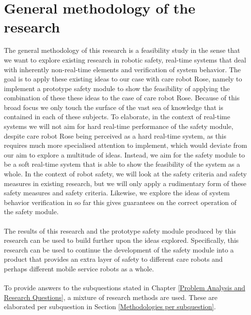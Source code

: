 \documentclass[12pt]{scrreprt}
\begin{document}
\section{General methodology of the research}
\label{General methodology of the research}
The general methodology of this research is a feasibility study in the sense that we want to explore existing research in robotic safety, real-time systems that deal with inherently non-real-time elements and verification of system behavior. The goal is to apply these existing ideas to our case with care robot Rose, namely to implement a prototype safety module to show the feasibility of applying the combination of these these ideas to the case of care robot Rose. Because of this broad focus we only touch the surface of the vast sea of knowledge that is contained in each of these subjects. To elaborate, in the context of real-time systems we will not aim for hard real-time performance of the safety module, despite care robot Rose being perceived as a hard real-time system, as this requires much more specialised attention to implement, which would deviate from our aim to explore a multitude of ideas. Instead, we aim for the safety module to be a soft real-time system that is able to show the feasibility of the system as a whole. In the context of robot safety, we will look at the safety criteria and safety measures in existing research, but we will only apply a rudimentary form of these safety measures and safety criteria. Likewise, we explore the ideas of system behavior verification in so far this gives guarantees on the correct operation of the safety module.
\\\\
The results of this research and the prototype safety module produced by this research can be used to build further upon the ideas explored. Specifically, this research can be used to continue the development of the safety module into a product that provides an extra layer of safety to different care robots and perhaps different mobile service robots as a whole.%
\\\\
To provide answers to the subquestions stated in Chapter \ref{Problem Analysis and Research Questions}, a mixture of research methods are used. These are elaborated per subquestion in Section \ref{Methodologies per subquestion}.
\end{document}
